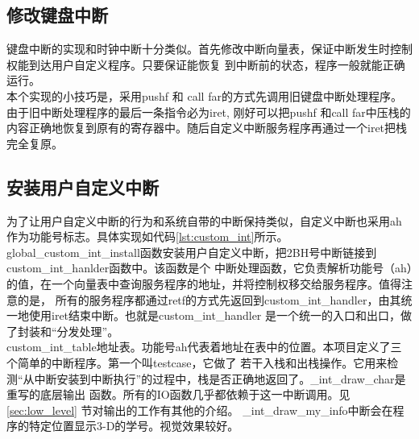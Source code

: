 \documentclass[a4paper]{article}
\begin{document}
    \subsection{修改键盘中断}
    键盘中断的实现和时钟中断十分类似。首先修改中断向量表，保证中断发生时控制权能到达用户自定义程序。只要保证能恢复
    到中断前的状态，程序一般就能正确运行。\\
    
    本个实现的小技巧是，采用pushf 和 call far的方式先调用旧键盘中断处理程序。由于旧中断处理程序的最后一条指令必为iret,
    刚好可以把pushf 和call far中压栈的内容正确地恢复到原有的寄存器中。随后自定义中断服务程序再通过一个iret把栈完全复原。
    \subsection{安装用户自定义中断}
    为了让用户自定义中断的行为和系统自带的中断保持类似，自定义中断也采用ah作为功能号标志。具体实现如代码\ref{lst:custom_int}所示。\\

    global\_custom\_int\_install函数安装用户自定义中断，把2BH号中断链接到custom\_int\_hanlder函数中。该函数是个
    中断处理函数，它负责解析功能号（ah）的值，在一个向量表中查询服务程序的地址，并将控制权移交给服务程序。值得注意的是，
    所有的服务程序都通过retf的方式先返回到custom\_int\_handler，由其统一地使用iret结束中断。也就是custom\_int\_handler
    是一个统一的入口和出口，做了封装和``分发处理''。\\
    
    custom\_int\_table地址表。功能号ah代表着地址在表中的位置。本项目定义了三个简单的中断程序。第一个叫testcase，它做了
    若干入栈和出栈操作。它用来检测``从中断安装到中断执行''的过程中，栈是否正确地返回了。\_int\_draw\_char是重写的底层输出
    函数。所有的IO函数几乎都依赖于这一中断调用。见\ref{sec:low_level}
    节对输出的工作有其他的介绍。
    \_int\_draw\_my\_info中断会在程序的特定位置显示3-D的学号。视觉效果较好。
    
\end{document}
